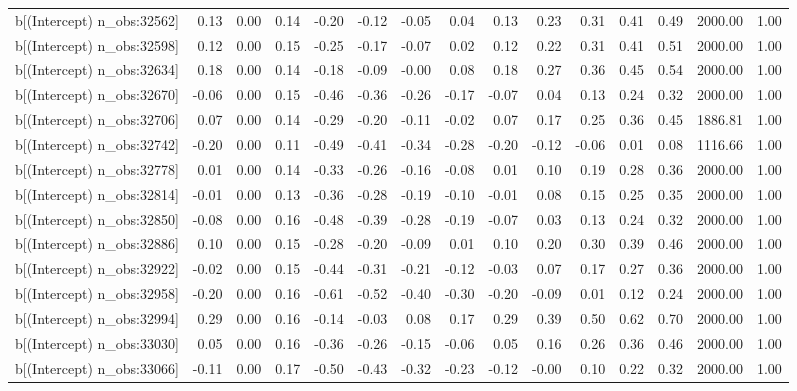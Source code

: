 \begin{table}[ht]
\begin{tabular}{rrrrrrrrrrrrrrr}
  b[(Intercept) n\_obs:32562] & 0.13 & 0.00 & 0.14 & -0.20 & -0.12 & -0.05 & 0.04 & 0.13 & 0.23 & 0.31 & 0.41 & 0.49 & 2000.00 & 1.00 \\ 
  b[(Intercept) n\_obs:32598] & 0.12 & 0.00 & 0.15 & -0.25 & -0.17 & -0.07 & 0.02 & 0.12 & 0.22 & 0.31 & 0.41 & 0.51 & 2000.00 & 1.00 \\ 
  b[(Intercept) n\_obs:32634] & 0.18 & 0.00 & 0.14 & -0.18 & -0.09 & -0.00 & 0.08 & 0.18 & 0.27 & 0.36 & 0.45 & 0.54 & 2000.00 & 1.00 \\ 
  b[(Intercept) n\_obs:32670] & -0.06 & 0.00 & 0.15 & -0.46 & -0.36 & -0.26 & -0.17 & -0.07 & 0.04 & 0.13 & 0.24 & 0.32 & 2000.00 & 1.00 \\ 
  b[(Intercept) n\_obs:32706] & 0.07 & 0.00 & 0.14 & -0.29 & -0.20 & -0.11 & -0.02 & 0.07 & 0.17 & 0.25 & 0.36 & 0.45 & 1886.81 & 1.00 \\ 
  b[(Intercept) n\_obs:32742] & -0.20 & 0.00 & 0.11 & -0.49 & -0.41 & -0.34 & -0.28 & -0.20 & -0.12 & -0.06 & 0.01 & 0.08 & 1116.66 & 1.00 \\ 
  b[(Intercept) n\_obs:32778] & 0.01 & 0.00 & 0.14 & -0.33 & -0.26 & -0.16 & -0.08 & 0.01 & 0.10 & 0.19 & 0.28 & 0.36 & 2000.00 & 1.00 \\ 
  b[(Intercept) n\_obs:32814] & -0.01 & 0.00 & 0.13 & -0.36 & -0.28 & -0.19 & -0.10 & -0.01 & 0.08 & 0.15 & 0.25 & 0.35 & 2000.00 & 1.00 \\ 
  b[(Intercept) n\_obs:32850] & -0.08 & 0.00 & 0.16 & -0.48 & -0.39 & -0.28 & -0.19 & -0.07 & 0.03 & 0.13 & 0.24 & 0.32 & 2000.00 & 1.00 \\ 
  b[(Intercept) n\_obs:32886] & 0.10 & 0.00 & 0.15 & -0.28 & -0.20 & -0.09 & 0.01 & 0.10 & 0.20 & 0.30 & 0.39 & 0.46 & 2000.00 & 1.00 \\ 
  b[(Intercept) n\_obs:32922] & -0.02 & 0.00 & 0.15 & -0.44 & -0.31 & -0.21 & -0.12 & -0.03 & 0.07 & 0.17 & 0.27 & 0.36 & 2000.00 & 1.00 \\ 
  b[(Intercept) n\_obs:32958] & -0.20 & 0.00 & 0.16 & -0.61 & -0.52 & -0.40 & -0.30 & -0.20 & -0.09 & 0.01 & 0.12 & 0.24 & 2000.00 & 1.00 \\ 
  b[(Intercept) n\_obs:32994] & 0.29 & 0.00 & 0.16 & -0.14 & -0.03 & 0.08 & 0.17 & 0.29 & 0.39 & 0.50 & 0.62 & 0.70 & 2000.00 & 1.00 \\ 
  b[(Intercept) n\_obs:33030] & 0.05 & 0.00 & 0.16 & -0.36 & -0.26 & -0.15 & -0.06 & 0.05 & 0.16 & 0.26 & 0.36 & 0.46 & 2000.00 & 1.00 \\ 
  b[(Intercept) n\_obs:33066] & -0.11 & 0.00 & 0.17 & -0.50 & -0.43 & -0.32 & -0.23 & -0.12 & -0.00 & 0.10 & 0.22 & 0.32 & 2000.00 & 1.00 \\ 

\end{tabular}
\end{table}
